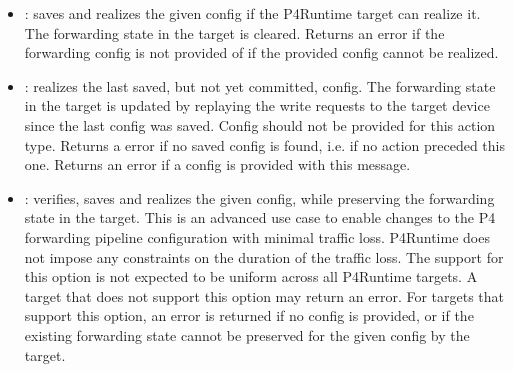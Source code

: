 \documentclass[11pt]{article}
\begin{document}
{\begin{itemize}
\item{}
: saves and realizes the given config if the P4Runtime
target can realize it. The forwarding state in the target is cleared. Returns
an  error if the forwarding config is not provided of if the
provided config cannot be realized.%

\item{}
: realizes the last saved, but not yet committed, config. The
forwarding state in the target is updated by replaying the write requests to
the target device since the last config was saved. Config should not be
provided for this action type. Returns a  error if no saved config
is found, i.e. if no  action preceded this one. Returns an
 error if a config is provided with this message.%

\item{}
: verifies, saves and realizes the given config, while
preserving the forwarding state in the target. This is an advanced use case to
enable changes to the P4 forwarding pipeline configuration with minimal
traffic loss. P4Runtime does not impose any constraints on the duration of the
traffic loss. The support for this option is not expected to be uniform across
all P4Runtime targets. A target that does not support this option may return
an  error. For targets that support this option, an
 error is returned if no config is provided, or if the
existing forwarding state cannot be preserved for the given config by the
target.%
\end{itemize}%

}
\end{document}
